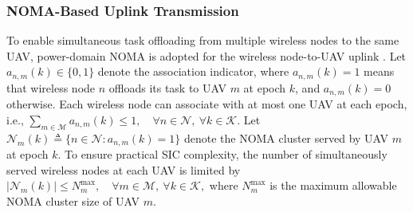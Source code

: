 \documentclass[journal]{IEEEtran}
\begin{document}
\subsubsection{NOMA-Based Uplink Transmission}

To enable simultaneous task offloading from multiple wireless nodes to
the same UAV, power-domain NOMA is adopted for the wireless
node-to-UAV uplink \cite{11020655}. Let $a_{n,m}(k)\in\{0,1\}$ denote the association
indicator, where $a_{n,m}(k)=1$ means that wireless node $n$ offloads
its task to UAV $m$ at epoch $k$, and $a_{n,m}(k)=0$ otherwise. Each wireless node can associate with at most one UAV at each epoch, i.e., $\sum_{m\in\mathcal{M}} a_{n,m}(k) \le 1,
    \quad \forall n\in\mathcal{N},\ \forall k\in\mathcal{K}. \label{eq:assoc_constraint}$
Let $\mathcal{N}_m(k)
    \triangleq \{n\in\mathcal{N}: a_{n,m}(k)=1\}
\label{eq:noma_cluster}$ denote the NOMA cluster served by UAV $m$ at epoch $k$. To ensure practical SIC complexity, the number of simultaneously served wireless nodes at each UAV is limited by $|\mathcal{N}_m(k)| \le N_m^{\max},
    \quad \forall m\in\mathcal{M},\ \forall k\in\mathcal{K},
\label{eq:noma_cluster_limit}$ where $N_m^{\max}$ is the maximum allowable NOMA cluster size of UAV $m$.
\end{document}
